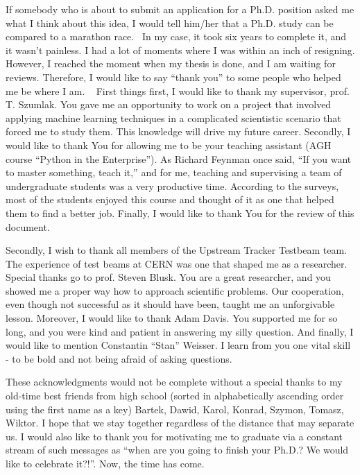 If somebody who is about to submit an application for a Ph.D. position asked me what I think about this idea, I would tell him/her that a Ph.D. study can be compared to a marathon race.  In my case, it took six years to complete it, and it wasn’t painless. I had a lot of moments where I was within an inch of resigning. However, I reached the moment when my thesis is done, and I am waiting for reviews. Therefore, I would like to say “thank you” to some people who helped me be where I am.
 
First things first, I would like to thank my supervisor, prof. T. Szumlak. You gave me an opportunity to work on a project that involved applying machine learning techniques in a complicated scientistic scenario that forced me to study them. This knowledge will drive my future career. Secondly, I would like to thank You for allowing me to be your teaching assistant (AGH course “Python in the Enterprise”). As Richard Feynman once said, “If you want to master something, teach it,” and for me, teaching and supervising a team of undergraduate students was a very productive time. According to the surveys, most of the students enjoyed this course and thought of it as one that helped them to find a better job. Finally, I would like to thank You for the review of this document. 


Secondly, I wish to thank all members of the Upstream Tracker Testbeam team. The experience of test beams at CERN was one that shaped me as a researcher. 
Special thanks go to prof. Steven Blusk. You are a great researcher, and you showed me a proper way how to approach scientific problems. Our cooperation, even though not successful as it should have been, taught me an unforgivable lesson. Moreover, I would like to thank Adam Davis. You supported me for so long, and you were kind and patient in answering my silly question. And finally, I would like to mention Constantin “Stan” Weisser. I learn from you one vital skill - to be bold and not being afraid of asking questions. 


These acknowledgments would not be complete without a special thanks to my old-time best friends from high school (sorted in alphabetically ascending order using the first name as a key) Bartek, Dawid, Karol, Konrad, Szymon, Tomasz, Wiktor. I hope that we stay together regardless of the distance that may separate us. I would also like to thank you for motivating me to graduate via a constant stream of such messages as “when are you going to finish your Ph.D.? We would like to celebrate it?!”. Now, the time has come. 

